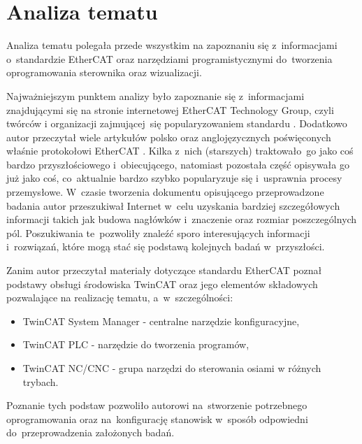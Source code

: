 \section{Analiza tematu}
Analiza tematu polegała przede wszystkim na zapoznaniu się z~informacjami o~standardzie EtherCAT oraz narzędziami programistycznymi do~tworzenia oprogramowania sterownika oraz wizualizacji.

Najważniejszym punktem analizy było zapoznanie się z~informacjami znajdującymi się na stronie internetowej EtherCAT Technology Group, czyli twórców i organizacji zajmującej~się popularyzowaniem standardu \cite{ETG_doc}.
Dodatkowo autor przeczytał wiele artykułów polsko oraz anglojęzycznych poświęconych właśnie protokołowi EtherCAT \cite{art1_etherCAT, art2_etherCAT, art3_etherCAT, art4_etherCAT, art5_etherCAT, art6_etherCAT, art7_etherCAT, art8_etherCAT, art9_etherCAT}. Kilka z~nich (starszych) traktowało~go jako coś bardzo przyszłościowego i~obiecującego, natomiast pozostała część opisywała go już jako coś, co~aktualnie bardzo szybko popularyzuje się i~usprawnia procesy przemysłowe.
W~czasie tworzenia dokumentu opisującego przeprowadzone badania autor przeszukiwał Internet w~celu uzyskania bardziej szczegółowych informacji takich jak budowa nagłówków i~znaczenie oraz rozmiar poszczególnych pól. Poszukiwania te~pozwoliły znaleźć sporo interesujących informacji i~rozwiązań, które mogą stać się podstawą kolejnych badań w~przyszłości.

Zanim autor przeczytał materiały dotyczące standardu EtherCAT poznał podstawy obsługi środowiska TwinCAT oraz jego elementów składowych pozwalające na realizację tematu, a~w~szczególności:
\begin{itemize}
\item TwinCAT System Manager - centralne narzędzie konfiguracyjne,
\item TwinCAT PLC - narzędzie do tworzenia programów,
\item TwinCAT NC/CNC - grupa narzędzi do sterowania osiami w różnych trybach.
\end{itemize} 
Poznanie tych podstaw pozwoliło autorowi na~stworzenie potrzebnego oprogramowania oraz na~konfigurację stanowisk w~sposób odpowiedni do~przeprowadzenia założonych badań.

